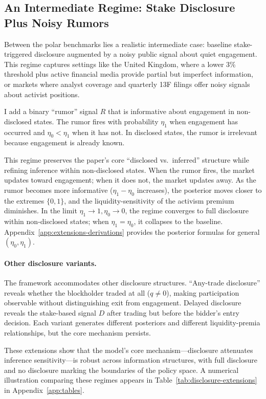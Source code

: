 \subsection{An Intermediate Regime: Stake Disclosure Plus Noisy Rumors}

Between the polar benchmarks lies a realistic intermediate case: baseline stake-triggered disclosure augmented by a noisy public signal about quiet engagement. This regime captures settings like the United Kingdom, where a lower 3\% threshold plus active financial media provide partial but imperfect information, or markets where analyst coverage and quarterly 13F filings offer noisy signals about activist positions.

I add a binary ``rumor'' signal $R$ that is informative about engagement in non-disclosed states. The rumor fires with probability $\eta_1$ when engagement has occurred and $\eta_0<\eta_1$ when it has not. In disclosed states, the rumor is irrelevant because engagement is already known.

This regime preserves the paper's core ``disclosed vs.\ inferred'' structure while refining inference within non-disclosed states. When the rumor fires, the market updates toward engagement; when it does not, the market updates away. As the rumor becomes more informative ($\eta_1-\eta_0$ increases), the posterior moves closer to the extremes $\{0,1\}$, and the liquidity-sensitivity of the activism premium diminishes. In the limit $\eta_1\to1,\eta_0\to0$, the regime converges to full disclosure within non-disclosed states; when $\eta_1=\eta_0$, it collapses to the baseline. Appendix~\ref{app:extensions-derivations} provides the posterior formulas for general $(\eta_0,\eta_1)$.

\paragraph{Other disclosure variants.}
The framework accommodates other disclosure structures. ``Any-trade disclosure'' reveals whether the blockholder traded at all ($q\neq0$), making participation observable without distinguishing exit from engagement. Delayed disclosure reveals the stake-based signal $D$ after trading but before the bidder's entry decision. Each variant generates different posteriors and different liquidity-premia relationships, but the core mechanism persists.

These extensions show that the model's core mechanism---disclosure attenuates inference sensitivity---is robust across information structures, with full disclosure and no disclosure marking the boundaries of the policy space. A numerical illustration comparing these regimes appears in Table~\ref{tab:disclosure-extensions} in Appendix~\ref{app:tables}.
